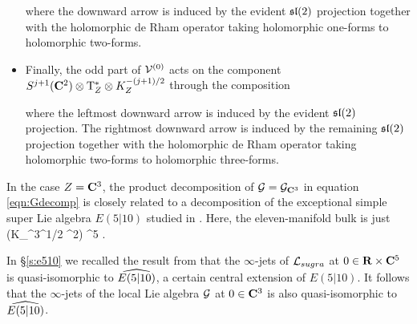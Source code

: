 \begin{itemize}
\beqn
{}
\eeqn
where the downward arrow is induced by the evident $\lie{sl}(2)$ projection together with the holomorphic de Rham operator taking holomorphic one-forms to holomorphic two-forms. 
\item Finally, the odd part of $\cV^{(0)}$ acts on the component $S^{j+1}(\C^2) \otimes \T^*_Z \otimes K^{-(j+1)/2}_Z$ through the composition
\beqn
{}
\eeqn
where the leftmost downward arrow is induced by the evident $\lie{sl}(2)$ projection.
The rightmost downward arrow is induced by the remaining $\lie{sl}(2)$ projection together with the holomorphic de Rham operator taking holomorphic two-forms to holomorphic three-forms.
\end{itemize}

\parsec[s:kacrelation]

In the case $Z = \C^3$, the product decomposition of $\cG = \cG_{\C^3}$ in equation \eqref{eqn:Gdecomp} is closely related to a decomposition of the exceptional simple super Lie algebra $E(5|10)$ studied in \cite{KR2}. 
Here, the eleven-manifold bulk is just 
\beqn
\R {}(K_{\C^3}^{1/2} \otimes \C^2) \simeq \R \times \C^5 .
\eeqn

In \S \ref{s:e510} we recalled the result from \cite{RSW} that the $\infty$-jets of $\cL_{sugra}$ at $0 \in \R \times \C^5$ is quasi-isomorphic to $\Hat{E(5|10)}$, a certain central extension of $E(5|10)$.
It follows that the $\infty$-jets of the local Lie algebra $\cG$ at $0 \in \C^3$ is also quasi-isomorphic to $\Hat{E(5|10)}$. 

